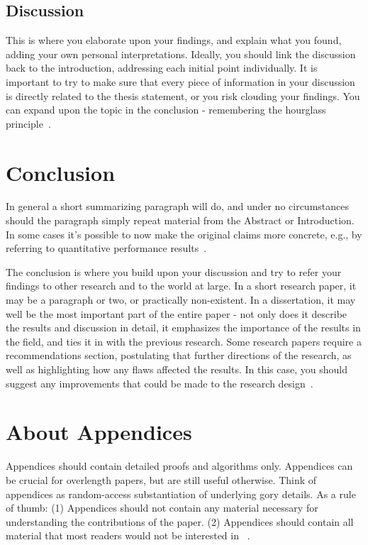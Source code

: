 \documentclass{winslabreport}
\begin{document}
\subsection{Discussion}
This is where you elaborate upon your findings, and explain what you found, adding your own personal interpretations. Ideally, you should link the discussion back to the introduction, addressing each initial point individually. It is important to try to make sure that every piece of information in your discussion is directly related to the thesis statement, or you risk clouding your findings. You can expand upon the topic in the conclusion - remembering the hourglass principle~\cite{Shuttleworth2016}.


\section{Conclusion}
In general a short summarizing paragraph will do, and under no circumstances should the paragraph simply repeat material from the Abstract or Introduction. In some cases it's possible to now make the original claims more concrete, e.g., by referring to quantitative performance results~\cite{Widom2006}.

The conclusion is where you build upon your discussion and try to refer your findings to other research and to the world at large. In a short research paper, it may be a paragraph or two, or practically non-existent. In a dissertation, it may well be the most important part of the entire paper - not only does it describe the results and discussion in detail, it emphasizes the importance of the results in the field, and ties it in with the previous research. Some research papers require a recommendations section, postulating that further directions of the research, as well as highlighting how any flaws affected the results. In this case, you should suggest any improvements that could be made to the research design~\cite{Shuttleworth2016}.




\appendix

\section{About Appendices}

Appendices should contain detailed proofs and algorithms only. Appendices can be crucial for overlength papers, but are still useful otherwise. Think of appendices as random-access substantiation of underlying gory details. As a rule of thumb: (1) Appendices should not contain any material necessary for understanding the contributions of the paper. (2) Appendices should contain all material that most readers would not be interested in ~\cite{Widom2006}.
\end{document}

